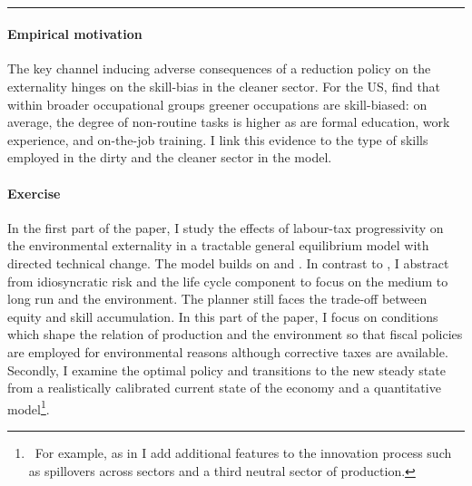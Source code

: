 \\

\noindent\rule[1ex]{\textwidth}{1pt}

\paragraph{Empirical motivation}
The key channel inducing adverse consequences of a reduction policy on the externality hinges on the skill-bias in the cleaner sector. %
For the US, \cite{Consoli2016DoCapital} find that within broader occupational groups greener occupations are skill-biased: on average, the degree of non-routine tasks is higher as are formal education, work experience, and on-the-job training. I link this evidence to the type of skills employed in the dirty and the cleaner sector in the model. %


\paragraph{Exercise}
In the first part of the paper, I study the effects of labour-tax progressivity  on the environmental externality in a tractable general equilibrium model with directed technical change. The model builds on \cite{Heathcote2017OptimalFramework} and \cite{Acemoglu2012TheChange}. 
In contrast to \cite{Heathcote2017OptimalFramework}, I abstract from idiosyncratic risk and the life cycle component to focus on the medium to long run and the environment. 
The planner still faces the trade-off between equity and skill accumulation. 
In this part of the paper, I focus on conditions which shape the relation of production and the environment so that fiscal policies are employed for environmental reasons although corrective taxes are available.  
Secondly, I examine the optimal policy and transitions to the new steady state from a realistically calibrated current state of the economy and a quantitative model\footnote{\ For example, as in  \cite{Fried2018ClimateAnalysis} I add additional features to the innovation process such as spillovers across sectors and a third neutral sector of production.}.

